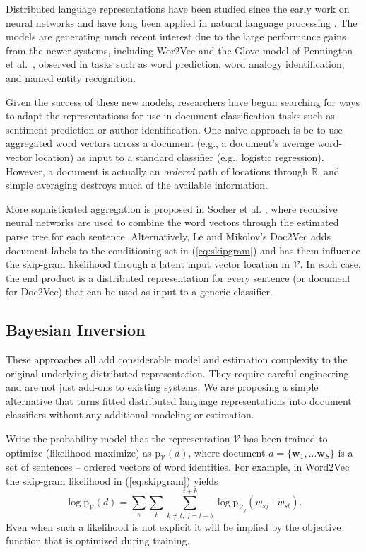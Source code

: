 \documentclass[11pt]{article}
\begin{document}
Distributed language representations have been studied since the early work on
neural networks \cite{rumelhart_learning_1986} and have long been applied in
natural language processing \cite{morin_hierarchical_2005}.  The models are
generating much recent interest due to the large performance gains from the
newer systems, including Wor2Vec and the Glove model of Pennington et
al.~, observed in tasks such as word
prediction, word analogy identification, and named entity recognition.

Given the success of these new models, researchers have begun searching for
ways to adapt the representations for use in document classification tasks
such as sentiment prediction or author identification.  One  naive approach is be
to use aggregated word vectors across a document (e.g., a document's average
word-vector location) as input to a standard classifier (e.g.,
logistic regression).  However, a document is actually  an {\it ordered} path
of  locations through $\mathds{R}$, and simple averaging destroys much of the available
information.  

More sophisticated aggregation is proposed in Socher et al.
, where recursive neural
networks are used to combine the word vectors through the estimated parse tree
for each sentence.  Alternatively,  Le and Mikolov's Doc2Vec
 adds document labels to the conditioning set
in (\ref{eq:skipgram}) and has them influence the skip-gram likelihood through
a latent input vector location in $\mathcal{V}$. In each case, the end product
is a distributed representation for every sentence (or document for Doc2Vec)
that can be used as input to a generic classifier.

\subsection{Bayesian Inversion}

These approaches all add considerable model and estimation complexity to the
original underlying distributed representation. They require careful
engineering and are not just add-ons to existing systems.   We are proposing a
simple alternative that turns fitted distributed language representations into
document classifiers without any additional modeling or estimation.  

Write the probability model that the representation $\mathcal{V}$ has been
trained to optimize (likelihood maximize) as $\mathrm{p}_{ \mathcal{V}}(d )$,
where document $d = \{\mathbf{w}_1, ... \mathbf{w}_S\}$ is a set of sentences 
-- ordered vectors of word identities.  
For example, in Word2Vec the skip-gram likelihood in
(\ref{eq:skipgram}) yields
\begin{equation}\label{eq:fulllhd}
\log\mathrm{p}_{ \mathcal{V}}(d) = \sum_s \sum_{t} \sum_{k\neq t,~j=t-b}^{t+b} 
\log\mathrm{p}_{ \mathcal{V}_y}(w_{sj}\mid w_{st} ).
\end{equation}
Even when such a likelihood is not explicit it will be implied by the objective function that is optimized during training.
\end{document}
